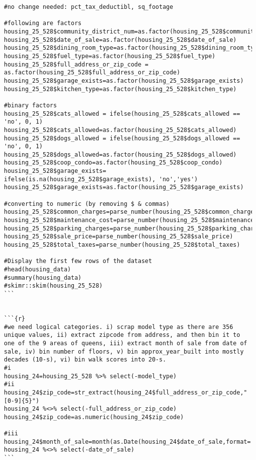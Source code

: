 \documentclass{article}
\begin{document}
\begin{lstlisting}
#no change needed: pct_tax_deductibl, sq_footage

#following are factors
housing_25_528$community_district_num=as.factor(housing_25_528$community_district_num)
housing_25_528$date_of_sale=as.factor(housing_25_528$date_of_sale)
housing_25_528$dining_room_type=as.factor(housing_25_528$dining_room_type)
housing_25_528$fuel_type=as.factor(housing_25_528$fuel_type)
housing_25_528$full_address_or_zip_code = as.factor(housing_25_528$full_address_or_zip_code)
housing_25_528$garage_exists=as.factor(housing_25_528$garage_exists)
housing_25_528$kitchen_type=as.factor(housing_25_528$kitchen_type)

#binary factors
housing_25_528$cats_allowed = ifelse(housing_25_528$cats_allowed == 'no', 0, 1)
housing_25_528$cats_allowed=as.factor(housing_25_528$cats_allowed)
housing_25_528$dogs_allowed = ifelse(housing_25_528$dogs_allowed == 'no', 0, 1)
housing_25_528$dogs_allowed=as.factor(housing_25_528$dogs_allowed)
housing_25_528$coop_condo=as.factor(housing_25_528$coop_condo)
housing_25_528$garage_exists= ifelse(is.na(housing_25_528$garage_exists), 'no','yes')
housing_25_528$garage_exists=as.factor(housing_25_528$garage_exists)

#converting to numeric (by removing $ & commas)
housing_25_528$common_charges=parse_number(housing_25_528$common_charges)
housing_25_528$maintenance_cost=parse_number(housing_25_528$maintenance_cost)
housing_25_528$parking_charges=parse_number(housing_25_528$parking_charges)
housing_25_528$sale_price=parse_number(housing_25_528$sale_price)
housing_25_528$total_taxes=parse_number(housing_25_528$total_taxes)

#Display the first few rows of the dataset
#head(housing_data)
#summary(housing_data)
#skimr::skim(housing_25_528)
```


```{r}
#we need logical categories. i) scrap model type as there are 356 unique values, ii) extract zipcode from address, and then bin it to one of the 9 areas of queens, iii) extract month of sale from date of sale, iv) bin number of floors, v) bin approx_year_built into mostly decades (10-s), vi) bin walk scores into 20-s.
#i
housing_24=housing_25_528 %>% select(-model_type)
#ii
housing_24$zip_code=str_extract(housing_24$full_address_or_zip_code,"[0-9]{5}") 
housing_24 %<>% select(-full_address_or_zip_code)
housing_24$zip_code=as.numeric(housing_24$zip_code)

#iii
housing_24$month_of_sale=month(as.Date(housing_24$date_of_sale,format='%m/%d/%Y'))
housing_24 %<>% select(-date_of_sale)
```                


\end{lstlisting}
\end{document}
